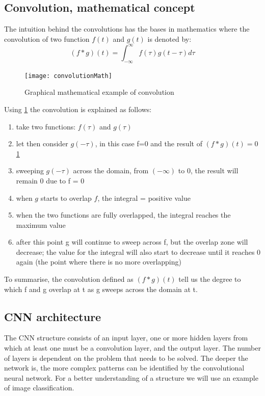 \subsection{Convolution, mathematical concept}
\par
The intuition behind the convolutions has the bases in mathematics where the convolution of two function $f(t)$ and $g(t)$  \cite{Goodfellow} is denoted by:
\begin{equation*}
    (f*g)(t) = \int_{-\infty}^{\infty}f(\tau)g(t-\tau) d\tau
\end{equation*}

\begin{figure}[H]
    \centering
    \texttt{[image: convolutionMath]}
    \caption{Graphical mathematical example of convolution}
    \label{fig:convolutionMath}
\end{figure}

\par
Using \cref{fig:convolutionMath} the convolution is explained as follows:
\begin{enumerate}
    \item take two functions: $f(\tau)$ and $g(\tau)$ 
	\item let then consider $g(-\tau)$, in this case f=0 and the result of $(f*g)(t) = 0$ \cref{fig:convolutionMath}
	\item sweeping $g(-\tau)$ across the domain, from $(-\infty)$ to 0, the result will remain 0 due to f = 0
	\item when $g$ starts to overlap $f$, the integral = positive value
	\item when the two functions are fully overlapped, the integral reaches the maximum value
	\item after this point g will continue to sweep across f, but the overlap zone will decrease; the value for the integral will also start to decrease until it reaches 0 again (the point where there is no more overlapping)
\end{enumerate}
 
To summarise, the convolution defined as $(f*g)(t)$ tell us the degree to which f and g overlap at t as g sweeps across the domain at t.

\subsection{CNN architecture}
\par
The CNN structure consists of an input layer, one or more hidden layers from which at least one must be a convolution layer, and the output layer. The number of layers is dependent on the problem that needs to be solved. The deeper the network is, the more complex patterns can be identified by the convolutional neural network. 
For a better understanding of a structure we will use an example of image classification.

